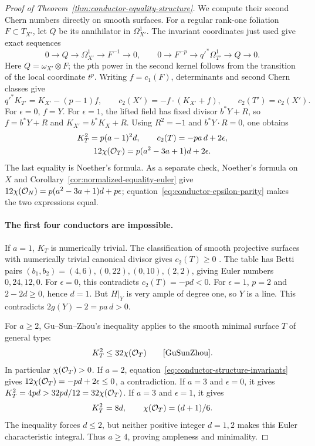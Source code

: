 \begin{proof}[Proof of Theorem~\ref{thm:conductor-equality-structure}]
We compute their second Chern numbers directly on smooth surfaces.
For a regular rank-one foliation $F\subset T_{X'}$, let $Q$
be its annihilator in $\Omega^1_{X'}$.
The invariant coordinates just used give exact sequences
\[
 0\to Q\to\Omega^1_{X'}\to F^{-1}\to0,
 \qquad
 0\to F^{-p}\to q'^*\Omega^1_{T'}\to Q\to0.
\]
Here $Q=\omega_{X'}\otimes F$; the $p$th power in the second
kernel follows from the transition of the local coordinate $t^p$.
Writing $f=c_1(F)$, determinants and second Chern classes give
\[
 q'^*K_{T'}=K_{X'}-(p-1)f,\qquad
 c_2(X')=-f\cdot(K_{X'}+f),\qquad c_2(T')=c_2(X').
\]
For $\epsilon=0$, $f=Y$. For $\epsilon=1$, the lifted
field has fixed divisor $b^*Y+R$, so $f=b^*Y+R$ and
$K_{X'}=b^*K_X+R$.
Using $R^2=-1$ and $b^*Y\cdot R=0$, one obtains
\begin{equation}\label{eq:conductor-structure-invariants}
\begin{gathered}
 K_T^2=p(a-1)^2d,\qquad c_2(T)=-pa\,d+2\epsilon,\\
 12\chi(\mathcal O_T)=p(a^2-3a+1)d+2\epsilon.
\end{gathered}
\end{equation}
The last equality is Noether's formula.
As a separate check, Noether's formula on $X$ and
Corollary~\ref{cor:normalized-equality-euler} give
$12\chi(\mathcal O_N)=p(a^2-3a+1)d+p\epsilon$;
equation~\eqref{eq:conductor-epsilon-parity} makes the two
expressions equal.

\paragraph{The first four conductors are impossible.}
If $a=1$, $K_T$ is numerically trivial.
The classification of smooth projective surfaces with numerically
trivial canonical divisor gives $c_2(T)\geq0$
\cite[\S2.1, Table~1, author p.~3]{MatsumotoMuN2023}.
The table has Betti pairs $(b_1,b_2)=(4,6),(0,22),(0,10),(2,2)$,
giving Euler numbers $0,24,12,0$.
For $\epsilon=0$, this contradicts $c_2(T)=-pd<0$.
For $\epsilon=1$, $p=2$ and $2-2d\geq0$, hence $d=1$.
But $H|_Y$ is very ample of degree one, so $Y$ is a line.
This contradicts $2g(Y)-2=pa\,d>0$.

For $a\geq2$, Gu--Sun--Zhou's inequality applies to the smooth
minimal surface $T$ of general type:
\[
 K_T^2\leq32\chi(\OO_T)
 \qquad\text{\cite[Theorem~1.5, p.~614;
 Corollary~3.4, pp.~623--624]{GuSunZhou}.}
\]
In particular $\chi(\mathcal O_T)>0$.
If $a=2$, equation~\eqref{eq:conductor-structure-invariants}
gives $12\chi(\mathcal O_T)=-pd+2\epsilon\leq0$, a contradiction.
If $a=3$ and $\epsilon=0$, it gives
$K_T^2=4pd>32pd/12=32\chi(\mathcal O_T)$.
If $a=3$ and $\epsilon=1$, it gives
\[
 K_T^2=8d,\qquad \chi(\mathcal O_T)=(d+1)/6.
\]
The inequality forces $d\leq2$, but neither positive integer
$d=1,2$ makes this Euler characteristic integral.
Thus $a\geq4$, proving ampleness and minimality.


\end{proof}
